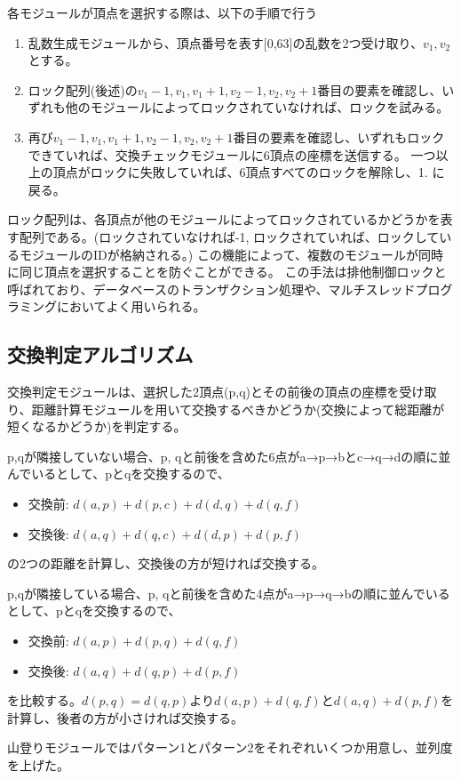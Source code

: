 各モジュールが頂点を選択する際は、以下の手順で行う
\begin{enumerate}
    \item 乱数生成モジュールから、頂点番号を表す[0,63]の乱数を2つ受け取り、$v_1, v_2$とする。
    \item ロック配列(後述)の$v_1-1, v_1, v_1+1, v_2-1, v_2, v_2+1$番目の要素を確認し、いずれも他のモジュールによってロックされていなければ、ロックを試みる。
    \item 再び$v_1-1, v_1, v_1+1, v_2-1, v_2, v_2+1$番目の要素を確認し、いずれもロックできていれば、交換チェックモジュールに6頂点の座標を送信する。
          一つ以上の頂点がロックに失敗していれば、6頂点すべてのロックを解除し、1. に戻る。
\end{enumerate}
ロック配列は、各頂点が他のモジュールによってロックされているかどうかを表す配列である。(ロックされていなければ-1, ロックされていれば、ロックしているモジュールのIDが格納される。)
この機能によって、複数のモジュールが同時に同じ頂点を選択することを防ぐことができる。
この手法は排他制御ロックと呼ばれており、データベースのトランザクション処理や、マルチスレッドプログラミングにおいてよく用いられる。

\subsection{交換判定アルゴリズム}
交換判定モジュールは、選択した2頂点(p,q)とその前後の頂点の座標を受け取り、距離計算モジュールを用いて交換するべきかどうか(交換によって総距離が短くなるかどうか)を判定する。

\hspace{10pt}p,qが隣接していない場合、p, qと前後を含めた6点がa→p→bとc→q→dの順に並んでいるとして、pとqを交換するので、
\begin{itemize}
    \item 交換前: $d(a,p)+d(p,c)+d(d,q)+d(q,f)$
    \item 交換後: $d(a,q)+d(q,c)+d(d,p)+d(p,f)$
\end{itemize}
の2つの距離を計算し、交換後の方が短ければ交換する。

\hspace{10pt}p,qが隣接している場合、p, qと前後を含めた4点がa→p→q→bの順に並んでいるとして、pとqを交換するので、
\begin{itemize}
    \item 交換前: $d(a,p)+d(p,q)+d(q,f)$
    \item 交換後: $d(a,q)+d(q,p)+d(p,f)$
\end{itemize}
を比較する。$d(p,q)=d(q,p)$より$d(a,p)+d(q,f)$と$d(a,q)+d(p,f)$を計算し、後者の方が小さければ交換する。

山登りモジュールではパターン1とパターン2をそれぞれいくつか用意し、並列度を上げた。

